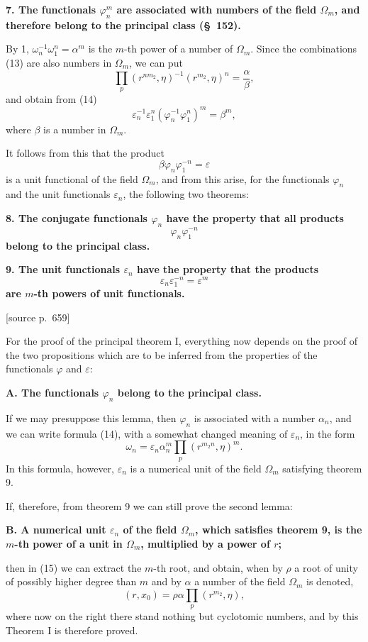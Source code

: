 \documentclass[11pt]{article}
\newcommand{\eps}{\varepsilon}
\newcommand{\srcpage}[1]{\par\medskip\noindent\textsf{[source p.~#1]}\par\smallskip}
\begin{document}
\textbf{7. The functionals $\varphi_n^m$ are associated with numbers of the field $\Omega_m$, and therefore belong to the principal class (\S~152).}

By 1, $\omega_n^{-1}\omega_1^n=\alpha^m$ is the $m$-th power of a number of $\Omega_m$. Since the combinations (13) are also numbers in $\Omega_m$, we can put
\[
  \prod_p (r^{n m_2},\eta)^{-1}(r^{m_2},\eta)^n=\frac{\alpha}{\beta},
\]
and obtain from (14)
\[
  \eps_n^{-1}\eps_1^n(\varphi_n^{-1}\varphi_1^n)^m=\beta^m,
\]
where $\beta$ is a number in $\Omega_m$.

It follows from this that the product
\[
  \beta\varphi_n\varphi_1^{-n}=\eps
\]
is a unit functional of the field $\Omega_m$, and from this arise, for the functionals $\varphi_n$ and the unit functionals $\eps_n$, the following two theorems:

\textbf{8. The conjugate functionals $\varphi_n$ have the property that all products}
\[
  \varphi_n\varphi_1^{-n}
\]
\textbf{belong to the principal class.}

\textbf{9. The unit functionals $\eps_n$ have the property that the products}
\[
  \eps_n\eps_1^{-n}=\eps^m
\]
\textbf{are $m$-th powers of unit functionals.}


\srcpage{659}
For the proof of the principal theorem I, everything now depends on the proof of the two propositions which are to be inferred from the properties of the functionals $\varphi$ and $\eps$:

\textbf{A. The functionals $\varphi_n$ belong to the principal class.}

If we may presuppose this lemma, then $\varphi_n$ is associated with a number $\alpha_n$, and we can write formula (14), with a somewhat changed meaning of $\eps_n$, in the form
\begin{equation}
  \omega_n=\eps_n\alpha_n^m\prod_p(r^{m_2n},\eta)^m.
\tag{15}
\end{equation}
In this formula, however, $\eps_n$ is a numerical unit of the field $\Omega_m$ satisfying theorem 9.

If, therefore, from theorem 9 we can still prove the second lemma:

\textbf{B. A numerical unit $\eps_n$ of the field $\Omega_m$, which satisfies theorem 9, is the $m$-th power of a unit in $\Omega_m$, multiplied by a power of $r$;}

then in (15) we can extract the $m$-th root, and obtain, when by $\rho$ a root of unity of possibly higher degree than $m$ and by $\alpha$ a number of the field $\Omega_m$ is denoted,
\begin{equation}
  (r,x_0)=\rho\alpha\prod_p(r^{m_2},\eta),
\tag{16}
\end{equation}
where now on the right there stand nothing but cyclotomic numbers, and by this Theorem I is therefore proved.
\end{document}
